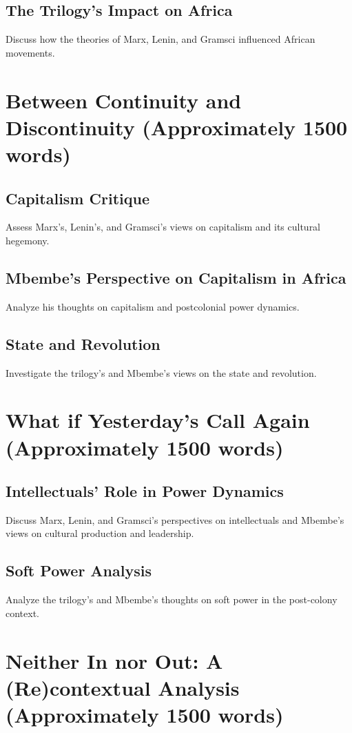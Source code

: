 \documentclass[12pt]{article}
\begin{document}
\subsection*{The Trilogy's Impact on Africa}
Discuss how the theories of Marx, Lenin, and Gramsci influenced African movements.

\section{Between Continuity and Discontinuity (Approximately 1500 words)}
\subsection*{Capitalism Critique}
Assess Marx's, Lenin's, and Gramsci's views on capitalism and its cultural hegemony.

\subsection*{Mbembe's Perspective on Capitalism in Africa}
Analyze his thoughts on capitalism and postcolonial power dynamics.

\subsection*{State and Revolution}
Investigate the trilogy's and Mbembe's views on the state and revolution.

\section{What if Yesterday's Call Again (Approximately 1500 words)}
\subsection*{Intellectuals' Role in Power Dynamics}
Discuss Marx, Lenin, and Gramsci's perspectives on intellectuals and Mbembe's views on cultural production and leadership.

\subsection*{Soft Power Analysis}
Analyze the trilogy's and Mbembe's thoughts on soft power in the post-colony context.

\section{Neither In nor Out: A (Re)contextual Analysis (Approximately 1500 words)}
\end{document}
